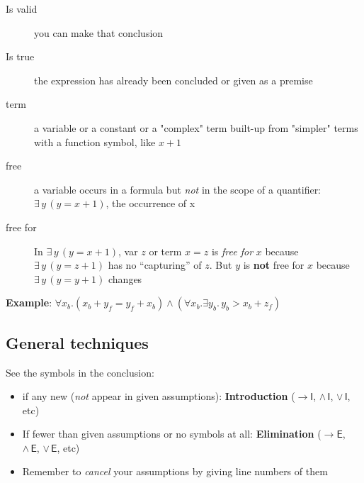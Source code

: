 \begin{description}
\item[Is valid] you can make that conclusion
\item[Is true] the expression has already been concluded or given as a premise
\item[term] a variable or a constant or a "complex" term built-up from "simpler" terms with a function symbol, like $x+1$
\item[free] a variable occurs in a formula but \emph{not} in the scope of a quantifier: $\exists\,y\,(y=x+1)$, the occurrence of x
\item[free for] In $\exists\,y\,(y=x+1)$, var $z$ or term $x=z$ is \emph{free for} $x$ because $\exists\,y\,(y=z+1)$ has no ``capturing'' of $z$. But $y$ is \textbf{not} free for $x$ because $\exists\,y\,(y=y+1)$ changes
\end{description}

\textbf{Example}: $\forall x_{b}.( x_{b} + y_{f} = y_{f} + x_{b}) \land (\forall x_{b}. \exists y_{b} .\, y_{b} > x_{b} + z_{f})$

\subsection*{General techniques}
See the symbols in the conclusion:
\begin{itemize}
\item if any new (\emph{not} appear in given assumptions): \textbf{Introduction} ($\mathsf{\rightarrow I}$, $\mathsf{\land\,I}$, $\mathsf{\lor\,I}$, etc)
\item If fewer than given assumptions or no symbols at all: \textbf{Elimination} ($\mathsf{\rightarrow E}$, $\mathsf{\land\,E}$, $\mathsf{\lor\,E}$, etc)
\item Remember to \emph{cancel} your assumptions by giving line numbers of them
\end{itemize}

